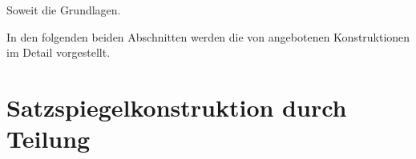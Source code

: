 \begin{Explain}
\iffalse%
  Damit sind alle Grundlagen der Satzspiegelberechnung, die bei
  {\KOMAScript} eine Rolle spielen, erklärt.
\else
  Soweit die Grundlagen.
\fi
\iffalse%
  Es folgen die beiden von \KOMAScript{} angebotenen Konstruktionen.
\else 
\iffalse%
  Wir können also mit den konkreten Konstruktionen beginnen. 
\else
  In den folgenden beiden Abschnitten werden die von {\KOMAScript} angebotenen
  Konstruktionen im Detail vorgestellt.
\fi
\fi
\end{Explain}


\section{Satzspiegelkonstruktion durch Teilung}

